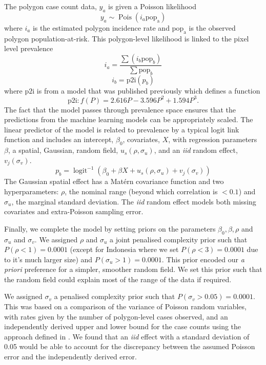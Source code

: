 \documentclass[review]{elsarticle}
\begin{document}
The polygon case count data, $y_a$ is given a Poisson likelihood
$$y_a \sim \operatorname{Pois}(i_a\mathrm{pop_a})$$
where $i_a$ is the estimated polygon incidence rate and $\mathrm{pop_a}$ is the observed polygon population-at-risk. 
This polygon-level likelihood is linked to the pixel level prevalence 
$$i_a = \frac{ \sum(i_b \mathrm{pop}_b)}{\sum  \mathrm{pop}_b} $$
$$i_b = \mathrm{p2i}(p_b)$$
where $\mathrm{p2i}$ is from a model that was published previously \citep{cameron2015defining} which defines a function
$$\mathrm{p2i}: f(P) = 2.616P - 3.596P^2 + 1.594P^3.$$
The fact that the model passes through prevalence space ensures that the predictions from the machine learning models can be appropriately scaled.
The linear predictor of the model is related to prevalence by a typical logit link function and includes an intercept, $\beta_0$, covariates, $X$, with regression parameters $\beta$, a spatial, Gaussian, random field, $u_s(\rho, \sigma_u)$, and an \emph{iid} random effect, $v_j(\sigma_v)$.
$$p_b = \operatorname{logit}^{-1}\left(\beta_0 + \beta X  + u_s(\rho, \sigma_u) + v_j(\sigma_v)\right)$$
The Gaussian spatial effect has a Mat\'ern covariance function and two hyperparameters: $\rho$, the nominal range (beyond which correlation is $< 0.1$) and $\sigma_u$, the marginal standard deviation.
The \emph{iid} random effect models both missing covariates and extra-Poisson sampling error.

Finally, we complete the model by setting priors on the parameters $\beta_0, \beta, \rho$ and $\sigma_u$ and $\sigma_v$. 
We assigned $\rho$ and $\sigma_u$ a joint penalised complexity prior \citep{fuglstad2018constructing} such that $P(\rho < 1) = 0.0001$ (except for Indonesia where we set $P(\rho < 3) = 0.0001$ due to it's much larger size) and $P(\sigma_u > 1) = 0.0001$. 
This prior encoded our \emph{a priori} preference for a simpler, smoother random field.
We set this prior such that the random field could explain most of the range of the data if required.

We assigned $\sigma_v$ a penalised complexity prior \citep{simpson2017penalising} such that $P(\sigma_v > 0.05) =  0.0001$. 
This was based on a comparison of the variance of Poisson random variables, with rates given by the number of polygon-level cases observed, and an independently derived upper and lower bound for the case counts using the approach defined in \citep{cibulskis2011worldwide}. 
We found that an \emph{iid} effect with a standard deviation of 0.05 would be able to account for the discrepancy between the assumed Poisson error and the independently derived error.
\end{document}
